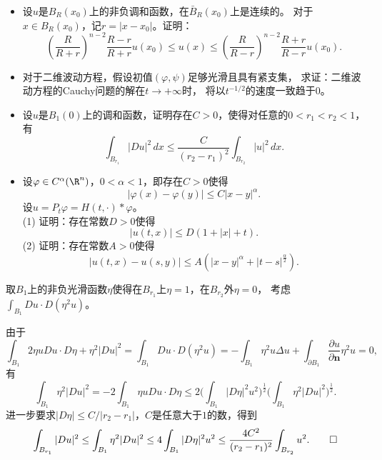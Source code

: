 \begin{itemize}
    \item[4.] 设$u$是$ B_{R}(x_0) $上的非负调和函数，在$\bar{B}_R(x_0)$上是连续的。
    对于$ x\in B_R(x_0) $，记$r=|x-x_0|$。证明：
    $$
    \left( \frac{R}{R+r} \right)^{n-2}\frac{R-r}{R+r}u(x_0) 
    \le u(x) \le \left( \frac{R}{R-r} \right)^{n-2}\frac{R+r}{R-r}u(x_0). 
    $$

    \item[5.] 对于二维波动方程，假设初值$( \varphi ,\psi ) $足够光滑且具有紧支集，
    求证：二维波动方程的Cauchy问题的解在$t \to +\infty$时，
    将以$ t^{-1/2} $的速度一致趋于$0$。

    \item[6.] 
    设$u$是$B_1(0)$上的调和函数，证明存在$C>0$，使得对任意的$0<r_1<r_2<1$，有
    $$\int_{B_{r_1}}|Du|^2\,dx
    \le\frac{C}{(r_2-r_1)^2}\int_{B_{r_2}}|u|^2\,dx.$$

    \item[7.]
    设$\varphi\in C^\alpha(\R^n)$，$0<\alpha<1$，即存在$C>0$使得
    $$|\varphi(x)-\varphi(y)|\le C|x-y|^\alpha.$$
    设$u=P_t\varphi=H(t,\cdot)*\varphi$。\\
    (1) 证明：存在常数$D>0$使得
    $$|u(t,x)|\le D(1+|x|+t).$$
    (2) 证明：存在常数$A>0$使得
    $$|u(t,x)-u(s,y)|\le A(|x-y|^\alpha+|t-s|^\frac{\alpha}{2}).$$
\end{itemize}
\begin{proofc}[6的提示]
    取$B_1$上的非负光滑函数$\eta$使得在$B_{r_1}$上$\eta=1$，在$B_{r_2}$外$\eta=0$，
    考虑$\displaystyle \int_{B_1}Du\cdot D(\eta^2u)$。
\end{proofc}
\begin{proofc}[6的解答]
    由于
    $$\int_{B_1}2\eta uDu\cdot D\eta+\eta^2|Du|^2
    =\int_{B_1}Du\cdot D(\eta^2u)
    =-\int_{B_1}\eta^2u\Delta u
    +\int_{\partial B_1}\frac{\partial u}{\partial\boldsymbol{n}}\eta^2u
    =0,$$
    有
    $$\int_{B_1}\eta^2|Du|^2=-2\int_{B_1}\eta uDu\cdot D\eta
    \le2\bigg(\int_{B_1}|D\eta|^2u^2\bigg)^\frac12
    \bigg(\int_{B_1}\eta^2|Du|^2\bigg)^\frac12.$$
    进一步要求$|D\eta|\le C/|r_2-r_1|$，$C$是任意大于$1$的数，得到
    $$\int_{B_{r_1}}|Du|^2\le\int_{B_1}\eta^2|Du|^2
    \le4\int_{B_1}|D\eta|^2u^2
    \le\frac{4C^2}{(r_2-r_1)^2}\int_{B_{r_2}}u^2.\qedhere$$
\end{proofc}
